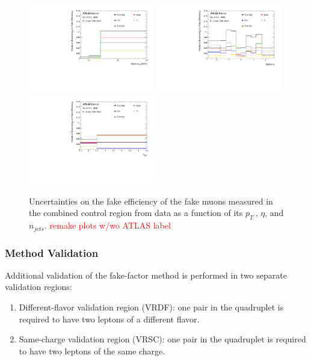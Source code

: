 \begin{figure}[htb]
		\begin{center}
		\includegraphics[width = 0.49\textwidth]{figures/Analysis/Background/SystematicUncertainties3D_Muon_pT.pdf}
		\includegraphics[width = 0.49\textwidth]{figures/Analysis/Background/SystematicUncertainties3D_Muon_eta.pdf}\\
		\includegraphics[width = 0.49\textwidth]{figures/Analysis/Background/SystematicUncertainties3D_Muon_njet.pdf} 
		\end{center}
	\caption{Uncertainties on the fake efficiency of the fake muons measured in the combined control region from data as a function of its $p_{T}~$, $\eta$, and $n_{jets}$. \textcolor{red}{remake plots w/wo ATLAS label} \label{fig:FakeEffUnc_3D_Muon}}
\end{figure}


\subsubsection{Method Validation}
\label{subsubsec:Validation}
Additional validation of the fake-factor method is performed in two separate validation regions:
\begin{enumerate}
	\item{ Different-flavor validation region (VRDF): one pair in the quadruplet is required to have two leptons of a different flavor.}
	\item{ Same-charge validation region (VRSC): one pair in the quadruplet is required to have two leptons of the same charge.}
\end{enumerate}

